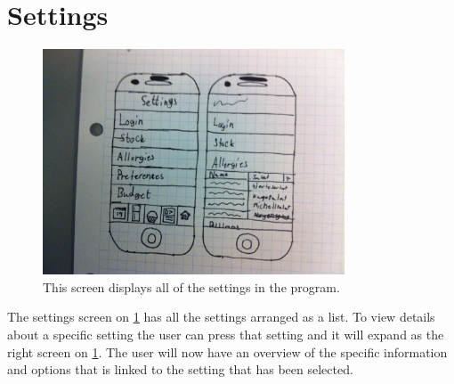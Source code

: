 \section{Settings}


\begin{figure}[H]
	\includegraphics[width=0.8\textwidth]{Grafik/FoodPlanner/FinalSettingsSketch}
	\caption{This screen displays all of the settings in the program.}
	\label{SettingsScreen}
\end{figure}

The settings screen on \cref{SettingsScreen} has all the settings arranged as a list. To view details about a specific setting the user can press that setting and it will expand as the right screen on \cref{SettingsScreen}. The user will now have an overview of the specific information and options that is linked to the setting that has been selected.  